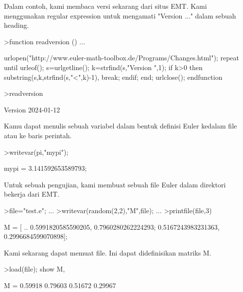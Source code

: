 \documentclass[a4paper,10pt]{article}
\begin{document}
\begin{eulernotebook}
\begin{eulercomment}
\begin{eulercomment}
\begin{eulercomment}
\begin{eulercomment}
\begin{eulercomment}
\begin{eulercomment}
\begin{eulercomment}
Dalam contoh, kami membaca versi sekarang dari situs EMT. Kami
menggunakan regular expression untuk mengamati "Version ..." dalam
sebuah heading.
\end{eulercomment}
\begin{eulerprompt}
>function readversion () ...
\end{eulerprompt}
\begin{eulerudf}
  urlopen("http://www.euler-math-toolbox.de/Programs/Changes.html");
  repeat
    until urleof();
    s=urlgetline();
    k=strfind(s,"Version ",1);
    if k>0 then substring(s,k,strfind(s,"<",k)-1), break; endif;
  end;
  urlclose();
  endfunction
\end{eulerudf}
\begin{eulerprompt}
>readversion
\end{eulerprompt}
\begin{euleroutput}
  Version 2024-01-12
\end{euleroutput}
\begin{eulercomment}
Kamu dapat menulis sebuah variabel dalam bentuk definisi Euler kedalam
file atau ke baris perintah.
\end{eulercomment}
\begin{eulerprompt}
>writevar(pi,"mypi");
\end{eulerprompt}
\begin{euleroutput}
  mypi = 3.141592653589793;
\end{euleroutput}
\begin{eulercomment}
Untuk sebuah pengujian, kami membuat sebuah file Euler dalam direktori
bekerja dari EMT.
\end{eulercomment}
\begin{eulerprompt}
>file="test.e"; ...
>writevar(random(2,2),"M",file); ...
>printfile(file,3)
\end{eulerprompt}
\begin{euleroutput}
  M = [ ..
  0.5991820585590205, 0.7960280262224293;
  0.5167243983231363, 0.2996684599070898];
\end{euleroutput}
\begin{eulercomment}
Kami sekarang dapat memuat file. Ini dapat didefinisikan matriks M.
\end{eulercomment}
\begin{eulerprompt}
>load(file); show M,
\end{eulerprompt}
\begin{euleroutput}
  M = 
    0.59918   0.79603 
    0.51672   0.29967 
\end{euleroutput}

\end{eulercomment}
\end{eulercomment}
\end{eulercomment}
\end{eulercomment}
\end{eulercomment}
\end{eulercomment}
\end{eulernotebook}
\end{document}
